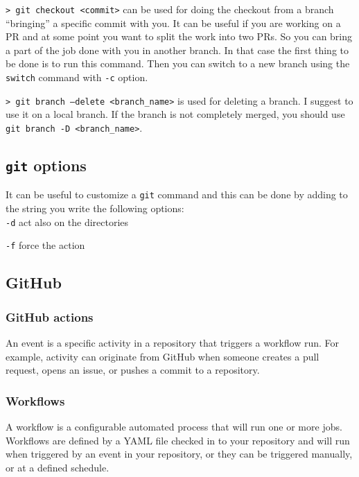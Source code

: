 \documentclass[11pt]{article}
\newcommand{\cmd}[1]{\colorbox{light-gray}{\textcolor{gio}{\texttt{#1}}}}
\begin{document}
\begin{multicols}{2}
\cmd{> git checkout <commit>} can be used for doing the checkout from a branch 
``bringing'' a specific commit with you. It can be useful if you are working on a
PR and at some point you want to split the work into two PRs. So you can bring a 
part of the job done with you in another branch. In that case the first thing to 
be done is to run this command. Then you can switch to a new branch using the 
\texttt{switch} command with \texttt{-c} option. 

\cmd{> git branch --delete <branch\_name>} is used for deleting a branch. I 
suggest to use it on a local branch. If the branch is not completely merged, 
you should use \texttt{git branch -D <branch\_name>}.



\subsection{\texttt{git} options}

It can be useful to customize a \texttt{git} command and this can be done by adding 
to the string you write the following options: \\

\cmd{-d} act also on the directories

\cmd{-f} force the action

\subsection{GitHub}

\subsubsection{GitHub actions}

An event is a specific activity in a repository that triggers a workflow run. 
For example, activity can originate from GitHub when someone creates a pull request, 
opens an issue, or pushes a commit to a repository.

\subsubsection{Workflows}

A workflow is a configurable automated process that will run one or more jobs. 
Workflows are defined by a YAML file checked in to your repository and will run 
when triggered by an event in your repository, or they can be triggered manually, 
or at a defined schedule. \\


\end{multicols}
\end{document}
